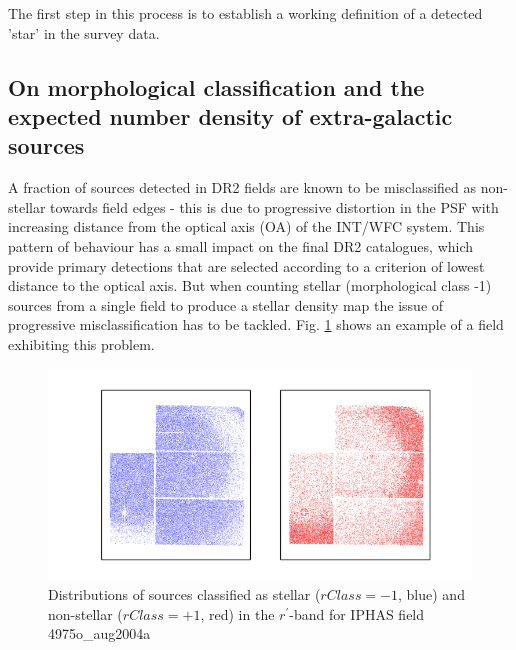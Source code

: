 \documentclass[a4paper,useAMS,usenatbib]{mn2e}
\begin{document}
The first step in this process is to establish a working definition of a detected 'star' in the survey data.


\subsection{On morphological classification and the expected number density of extra-galactic sources}
\label{subsec:galaxy_density}

A fraction of sources detected in DR2 fields are known to be misclassified as 
non-stellar towards field edges - this is due to progressive distortion in the PSF with increasing 
distance from the optical axis (OA) of the INT/WFC system. This pattern of behaviour has a small 
impact on the final DR2 catalogues, which provide primary detections that are selected according to 
a criterion of lowest distance to the optical axis.  But when counting stellar (morphological class -1) 
sources from a single field to produce a stellar density map the issue of progressive misclassification 
has to be tackled. Fig. \ref{fig:misclassification} shows an example of a field exhibiting this problem.

\begin{figure}
\begin{center}
\includegraphics[width=1\linewidth]{figures/morphology_misclassification.png} 
\caption{\footnotesize{Distributions of sources classified as stellar ($rClass=-1$, blue) 
and non-stellar ($rClass=+1$, red) in the $r^{\prime}$-band for IPHAS field 4975o\_aug2004a} }
\label{fig:misclassification}
\end{center}
\end{figure}
\end{document}
